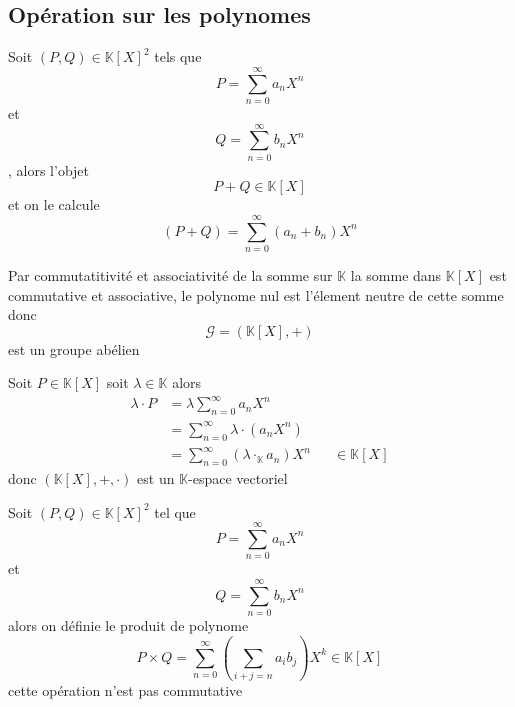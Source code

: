 \documentclass[11pt,colorlinks]{book}
\theoremstyle{mytheoremstyle}
\theoremstyle{mytheoremstyle}
\theoremstyle{mytheoremstyle}
\theoremstyle{mytheoremstyle}
\theoremstyle{mytheoremstyle}
\theoremstyle{mytheoremstyle}
\theoremstyle{mytheoremstyle}
\theoremstyle{mytheoremstyle}
\theoremstyle{myproblemstyle}
\def\mbb#1{\mathbb{#1}}
\def\mfc#1{\mathcal{#1}}
\def\bK{\mbb{K}}
\def\ev{espace vectoriel }
\begin{document}
\subsection{Opération sur les polynomes}
\begin{prop}[Somme]
  Soit $(P,Q) \in \bK[X]^2$ tels que 
  \begin{equation*}
    P = \sum_{n=0}^{\infty} a_n X^n
  \end{equation*} et 
  \begin{equation*}
    Q = \sum_{n=0}^{\infty} b_n X^n
  \end{equation*}, alors l'objet 
  \begin{equation*}
    P+Q \in \bK[X]
  \end{equation*}
  et on le calcule 
  \begin{equation*}
    (P+Q) = \sum_{n=0}^{\infty} (a_n+b_n) X^n
  \end{equation*}
\end{prop}
\begin{rmq}
  Par commutatitivité et associativité de la somme sur $\bK$ la somme dans $\bK[X]$ est commutative et associative, le polynome nul est l'élement neutre de cette somme
  donc 
  \begin{equation*}
    \mfc{G} = (\bK[X],+)
  \end{equation*}
  est un groupe abélien
\end{rmq}
\begin{rmq}
  Soit $P \in \bK[X]$ soit $\lambda \in \bK$ alors 
  \begin{align*}
    \lambda \cdot P &= \lambda \sum_{n=0}^{\infty} a_n X^n \\ 
    &= \sum_{n=0}^{\infty} \lambda \cdot (a_n X^n) \\
    &= \sum_{n=0}^{\infty} (\lambda \cdot_{\bK} a_n) X^n && \in \bK[X]
  \end{align*}
  donc $(\bK[X],+,\cdot)$ est un $\bK$-\ev
\end{rmq}
\begin{prop}[Produit]
  Soit $(P,Q) \in \bK[X]^2$ tel que 
  \begin{equation*}
    P = \sum_{n=0}^{\infty} a_n X^n
  \end{equation*} et 
  \begin{equation*}
    Q = \sum_{n=0}^{\infty} b_n X^n
  \end{equation*}
  alors on définie le produit de polynome
  \begin{equation*}
    P\times Q = \sum_{n=0}^{\infty} \left(\sum_{i+j=n} a_i b_j\right) X^k \in \bK[X]
  \end{equation*}
  cette opération n'est pas commutative
\end{prop}
\end{document}
